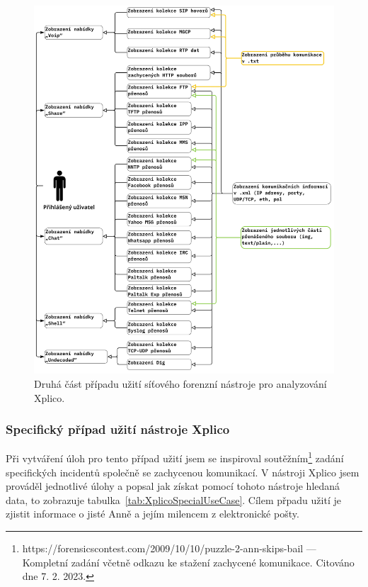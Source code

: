                 \begin{figure}[H]
                    \centering
                    \includegraphics[scale=0.13]{obrazky-figures/usecases/Xplico_usecase2.jpg}
                    \caption{Druhá část případu užití síťového forenzní nástroje pro analyzování Xplico.}
                    \label{fig:my_label}
                \end{figure}
            \subsubsection*{Specifický případ užití nástroje Xplico}
            \label{specUseCaseXplico}
                Při vytváření úloh pro tento případ užití jsem se inspiroval soutěžním\footnote{https://forensicscontest.com/2009/10/10/puzzle-2-ann-skips-bail --- Kompletní zadání včetně odkazu ke stažení zachycené komunikace. Citováno dne 7. 2. 2023.} zadání specifických incidentů společně se zachycenou komunikací. V nástroji Xplico jsem prováděl jednotlivé úlohy a popsal jak získat pomocí tohoto nástroje hledaná data, to zobrazuje tabulka~\ref{tab:XplicoSpecialUseCase}. Cílem přpadu užití je zjistit informace o jisté Anně a jejím milencem z elektronické pošty.

